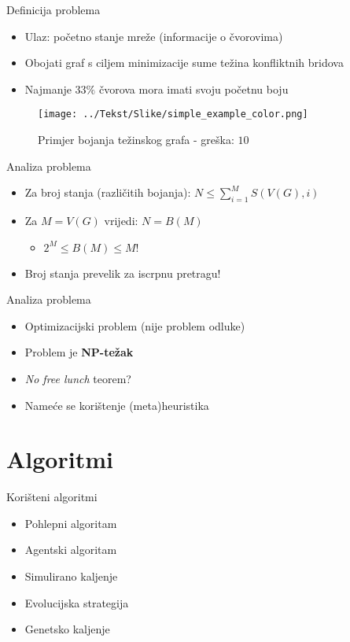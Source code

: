\documentclass[utf8]{beamer}
\begin{document}
\begin{frame}{Definicija problema}
	\begin{itemize}
		\item Ulaz: početno stanje mreže (informacije o čvorovima)
		\pause
		\item Obojati graf s ciljem minimizacije sume težina konfliktnih bridova
		\pause
		\item Najmanje $33\%$ čvorova mora imati svoju početnu boju
	\end{itemize}
	\pause
	\begin{figure}[h]
  \caption{Primjer bojanja težinskog grafa - greška: $10$}
  \centering
    \texttt{[image: ../Tekst/Slike/simple\_example\_color.png]}
	\end{figure}
\end{frame}

\begin{frame}{Analiza problema}
	\begin{itemize}
		\item Za broj stanja (različitih bojanja): $N \le \sum_{i=1}^{M} S(V(G), i)$
		\pause
		\item Za $M=V(G)$ vrijedi: $N=B(M)$
		\begin{itemize}
			\item $2^M \le B(M) \le M!$
		\end{itemize}
		\pause
		\item Broj stanja prevelik za iscrpnu pretragu!
	\end{itemize}
\end{frame}

\begin{frame}{Analiza problema}
	\begin{itemize}
		\item Optimizacijski problem (nije problem odluke)
		\pause
		\item Problem je \textbf{NP-težak}
		\pause
		\item \emph{No free lunch} teorem?
		\pause
		\item Nameće se korištenje (meta)heuristika
	\end{itemize}
\end{frame}

\section{Algoritmi}
\begin{frame}{Korišteni algoritmi}
	\begin{itemize}
		\item Pohlepni algoritam
		\pause
		\item Agentski algoritam
		\pause
		\item Simulirano kaljenje
		\pause
		\item Evolucijska strategija
		\pause
		\item Genetsko kaljenje
	\end{itemize}
\end{frame}
\end{document}
